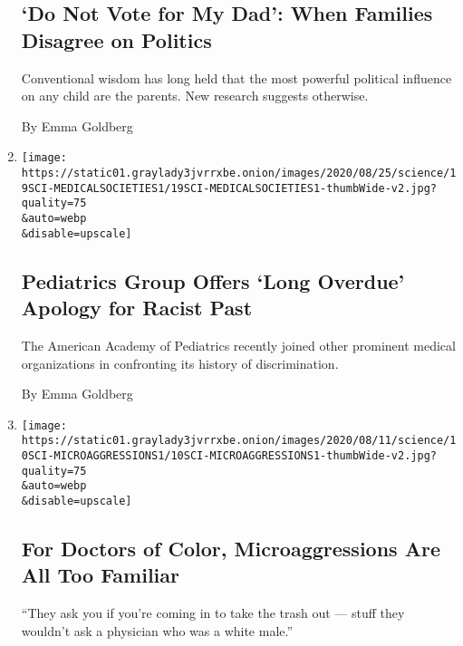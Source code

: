 \begin{enumerate}
  \hypertarget{do-not-vote-for-my-dad-when-families-disagree-on-politics}{%
  \subsection{`Do Not Vote for My Dad': When Families Disagree on
  Politics}\label{do-not-vote-for-my-dad-when-families-disagree-on-politics}}

  Conventional wisdom has long held that the most powerful political
  influence on any child are the parents. New research suggests
  otherwise.

  By Emma Goldberg
\item
  \href{/2020/08/20/health/pediatrics-medicine-racial-discrimination.html}{}

  \texttt{[image: https://static01.graylady3jvrrxbe.onion/images/2020/08/25/science/19SCI-MEDICALSOCIETIES1/19SCI-MEDICALSOCIETIES1-thumbWide-v2.jpg?quality=75\\\&auto=webp\\\&disable=upscale]}

  \hypertarget{pediatrics-group-offers-long-overdue-apology-for-racist-past}{%
  \subsection{Pediatrics Group Offers `Long Overdue' Apology for Racist
  Past}\label{pediatrics-group-offers-long-overdue-apology-for-racist-past}}

  The American Academy of Pediatrics recently joined other prominent
  medical organizations in confronting its history of discrimination.

  By Emma Goldberg
\item
  \href{/2020/08/11/health/microaggression-medicine-doctors.html}{}

  \texttt{[image: https://static01.graylady3jvrrxbe.onion/images/2020/08/11/science/10SCI-MICROAGGRESSIONS1/10SCI-MICROAGGRESSIONS1-thumbWide-v2.jpg?quality=75\\\&auto=webp\\\&disable=upscale]}

  \hypertarget{for-doctors-of-color-microaggressions-are-all-too-familiar}{%
  \subsection{For Doctors of Color, Microaggressions Are All Too
  Familiar}\label{for-doctors-of-color-microaggressions-are-all-too-familiar}}

  ``They ask you if you're coming in to take the trash out --- stuff
  they wouldn't ask a physician who was a white male.''


\end{enumerate}
